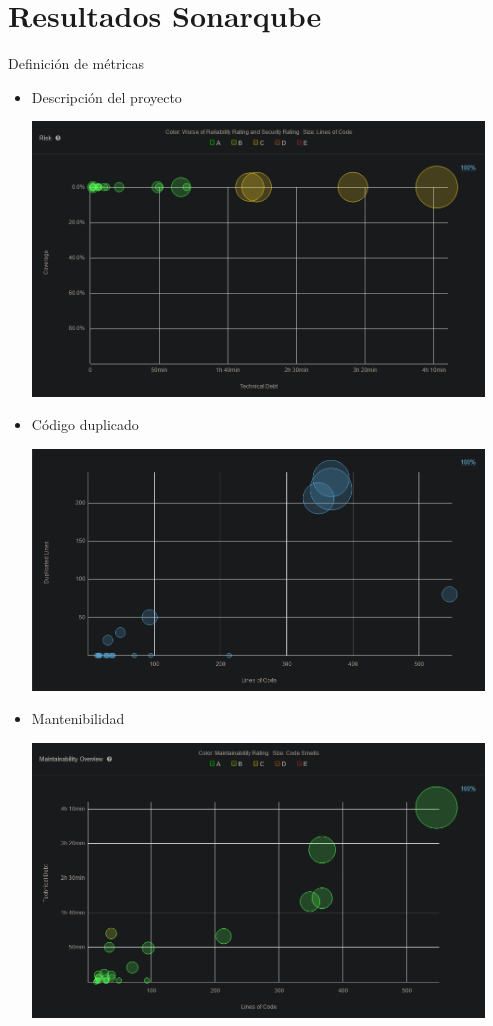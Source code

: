 \documentclass[preprint,12pt]{elsarticle}
\begin{document}
\section{Resultados Sonarqube}
Definición de métricas

\begin{itemize}

		\item Descripción del proyecto
	\begin{center}
	\includegraphics[width=12cm]{./imagen/Screenshot_2020-10-30 Project Overview.png} 
	\end{center}

		\item Código duplicado
	\begin{center}
	\includegraphics[width=12cm]{./imagen/Screenshot_2020-10-30 Duplications Overview.png} 
	\end{center}

		\item Mantenibilidad
	\begin{center}
	\includegraphics[width=12cm]{./imagen/Screenshot_2020-10-30 Maintainability Overview.png} 
	\end{center}
	

\end{itemize}
\end{document}
